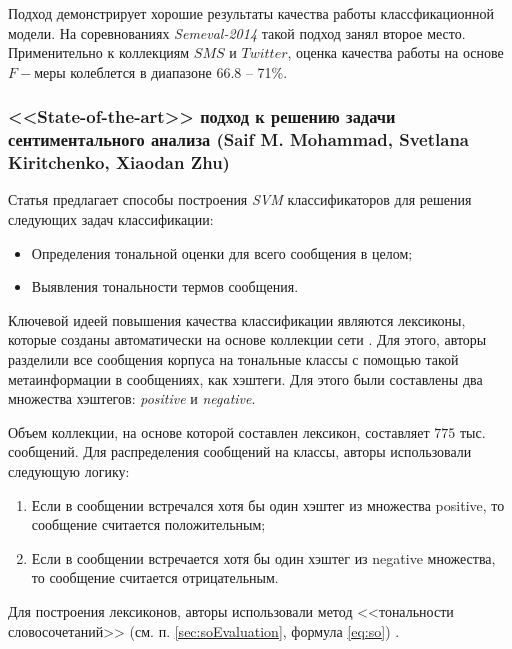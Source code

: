         Подход демонстрирует хорошие результаты качества работы классфикационной
        модели. На соревнованиях {\it Semeval-2014} такой подход занял второе
        место.
        Применительно к коллекциям $SMS$ и $Twitter$, оценка качества работы на
        основе $F-$меры колеблется в диапазоне 66.8 -- 71\%.

        \subsubsection{<<State-of-the-art>> подход к решению задачи
            сентиментального анализа (Saif M. Mohammad, Svetlana Kiritchenko, Xiaodan Zhu)}

        Статья \cite{modernApproach} предлагает способы построения {\it SVM}
        классификаторов для решения следующих задач классификации:
        \begin{itemize}
            \item Определения тональной оценки для всего сообщения в целом;
            \item Выявления тональности термов сообщения.
        \end{itemize}

        Ключевой идеей повышения качества классификации являются лексиконы,
        которые созданы автоматически на основе коллекции сети \twitter.
        Для этого, авторы разделили все сообщения корпуса на тональные классы с
        помощью такой метаинформации в сообщениях, как хэштеги.
        Для этого были составлены два множества хэштегов: {\it positive} и
        {\it negative}.

        Объем коллекции, на основе которой составлен лексикон, составляет $775$
        тыс. сообщений. Для распределения сообщений на классы, авторы использовали
        следующую логику:
        \begin{enumerate}
            \item Если в сообщении встречался хотя бы один хэштег из множества positive, то
                сообщение считается положительным;
            \item Если в сообщении встречается хотя бы один хэштег из negative множества, то
                сообщение считается отрицательным.
        \end{enumerate}

        Для построения лексиконов, авторы использовали метод <<тональности словосочетаний>>
        (см. п. \ref{sec:soEvaluation}, формула \ref{eq:so}) \cite{lexiconSO}.

